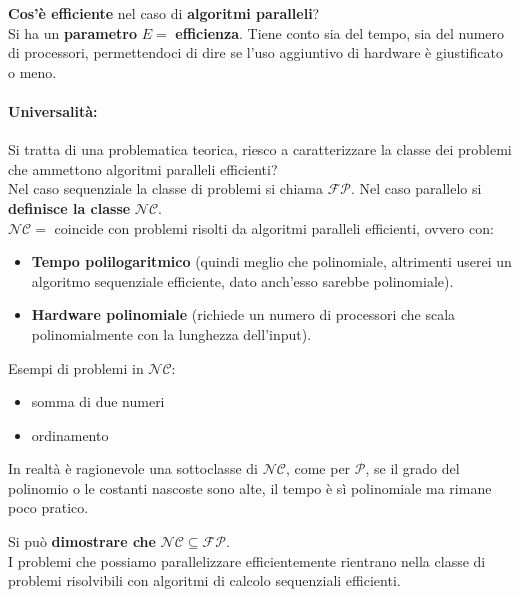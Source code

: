 \textbf{Cos'è efficiente} nel caso di \textbf{algoritmi paralleli}?\\
Si ha un \textbf{parametro} $E= $ \textbf{efficienza}. 	Tiene conto sia del tempo, sia del numero di processori, permettendoci di dire se l'uso aggiuntivo di hardware è giustificato o meno.\\

\paragraph{Universalità:} Si tratta di una problematica teorica, riesco a caratterizzare la classe dei problemi che ammettono algoritmi paralleli efficienti?\\

Nel caso sequenziale la classe di problemi si chiama $\mathcal{FP}$. Nel caso parallelo si \textbf{definisce la classe} $\mathcal{NC}$.\\

$\mathcal{NC} = $ coincide con problemi risolti da algoritmi paralleli efficienti, ovvero con:
\begin{itemize}
	\item \textbf{Tempo polilogaritmico} (quindi meglio che polinomiale, altrimenti userei un algoritmo sequenziale efficiente, dato anch'esso sarebbe polinomiale).\\
	\item \textbf{Hardware polinomiale} (richiede un numero di processori che scala polinomialmente con la lunghezza dell'input).\\
\end{itemize}

Esempi di problemi in $\mathcal{NC}$: 
\begin{itemize}
	\item somma di due numeri
	\item ordinamento 
\end{itemize}

In realtà è ragionevole una sottoclasse di $\mathcal{NC}$, come per $\mathcal{P}$, se il grado del polinomio o le costanti nascoste sono alte, il tempo è sì polinomiale ma rimane poco pratico.\\

\newpage

Si può \textbf{dimostrare che} $\mathcal{NC} \subseteq \mathcal{FP}$.\\
I problemi che possiamo parallelizzare efficientemente rientrano nella classe di problemi risolvibili con algoritmi di calcolo sequenziali efficienti.\\

